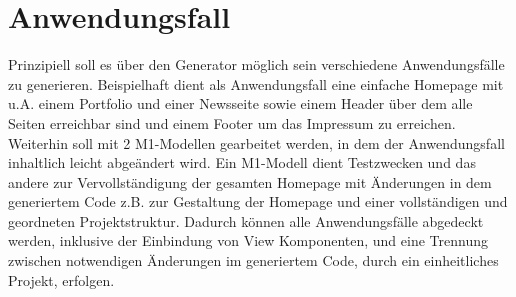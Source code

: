 \section{Anwendungsfall}
\label{Anwendungsfall}
Prinzipiell soll es über den Generator möglich sein verschiedene Anwendungsfälle
zu generieren. Beispielhaft dient als Anwendungsfall eine einfache Homepage mit u.A.
einem Portfolio und einer Newsseite sowie einem Header über dem alle Seiten erreichbar sind und
einem Footer um das Impressum zu erreichen. Weiterhin soll mit 2 M1-Modellen
gearbeitet werden, in dem der Anwendungsfall inhaltlich leicht abgeändert wird.
Ein M1-Modell dient Testzwecken und das andere zur Vervollständigung der
gesamten Homepage mit Änderungen in dem generiertem Code z.B. zur Gestaltung der
Homepage und einer vollständigen und geordneten Projektstruktur.
Dadurch können alle Anwendungsfälle abgedeckt werden, inklusive der Einbindung
von View Komponenten, und eine Trennung zwischen notwendigen Änderungen im
generiertem Code, durch ein einheitliches Projekt, erfolgen.
